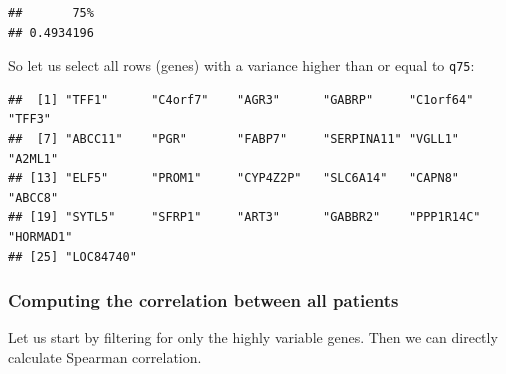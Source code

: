 \documentclass[
]{book}
\newenvironment{Shaded}{\begin{snugshade}}{\end{snugshade}}
\newcommand{\AttributeTok}[1]{\textcolor[rgb]{0.13,0.29,0.53}{#1}}
\newcommand{\CommentTok}[1]{\textcolor[rgb]{0.56,0.35,0.01}{\textit{#1}}}
\newcommand{\DocumentationTok}[1]{\textcolor[rgb]{0.56,0.35,0.01}{\textbf{\textit{#1}}}}
\newcommand{\FunctionTok}[1]{\textcolor[rgb]{0.13,0.29,0.53}{\textbf{#1}}}
\newcommand{\NormalTok}[1]{#1}
\newcommand{\OtherTok}[1]{\textcolor[rgb]{0.56,0.35,0.01}{#1}}
\newcommand{\SpecialCharTok}[1]{\textcolor[rgb]{0.81,0.36,0.00}{\textbf{#1}}}
\newcommand{\StringTok}[1]{\textcolor[rgb]{0.31,0.60,0.02}{#1}}
\begin{document}
\begin{verbatim}
##       75% 
## 0.4934196
\end{verbatim}

So let us select all rows (genes) with a variance higher than or equal to \texttt{q75}:

\begin{Shaded}
\end{Shaded}

\begin{verbatim}
##  [1] "TFF1"      "C4orf7"    "AGR3"      "GABRP"     "C1orf64"   "TFF3"     
##  [7] "ABCC11"    "PGR"       "FABP7"     "SERPINA11" "VGLL1"     "A2ML1"    
## [13] "ELF5"      "PROM1"     "CYP4Z2P"   "SLC6A14"   "CAPN8"     "ABCC8"    
## [19] "SYTL5"     "SFRP1"     "ART3"      "GABBR2"    "PPP1R14C"  "HORMAD1"  
## [25] "LOC84740"
\end{verbatim}

\hypertarget{computing-the-correlation-between-all-patients}{%
\subsubsection{Computing the correlation between all patients}\label{computing-the-correlation-between-all-patients}}

Let us start by filtering for only the highly variable genes. Then we can directly calculate Spearman correlation.

\begin{Shaded}
\end{Shaded}
\end{document}
